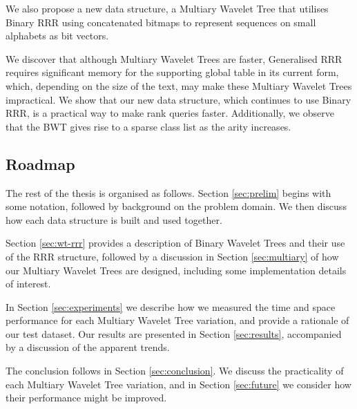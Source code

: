 We also propose a new data structure, a Multiary Wavelet Tree that utilises 
Binary RRR using concatenated bitmaps to represent sequences on small alphabets 
as bit vectors.

We discover that although Multiary Wavelet Trees are faster, Generalised RRR 
requires significant memory for the supporting global table in its current form, 
which, depending on the size of the text, may make these Multiary Wavelet Trees 
impractical. We show that our new data structure, which continues to use 
Binary RRR, is a practical way to make rank queries faster. Additionally, we 
observe that the BWT gives rise to a sparse class list as the arity increases.


\subsection{Roadmap}

The rest of the thesis is organised as follows. Section \ref{sec:prelim} begins 
with some notation, followed by background on the problem 
domain. We then discuss how each data structure is built and used together.

Section \ref{sec:wt-rrr} provides a description of Binary Wavelet Trees and 
their use of the RRR structure, followed by a discussion in Section 
\ref{sec:multiary} of how our Multiary Wavelet Trees are designed, including 
some implementation details of interest.

In Section \ref{sec:experiments} we describe how we measured the 
time and space performance for each Multiary Wavelet Tree variation,
and provide a rationale of our test dataset. Our results are presented in 
Section \ref{sec:results}, accompanied by a discussion of the apparent trends.

The conclusion follows in Section \ref{sec:conclusion}. We discuss the 
practicality of each Multiary Wavelet Tree variation, and in Section \ref{sec:future} we 
consider how their performance might be improved.

